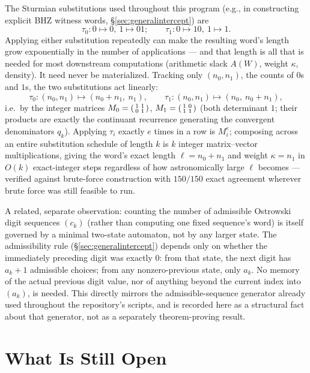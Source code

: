 \documentclass[11pt]{article}
\begin{document}
The Sturmian substitutions used throughout this program (e.g., in constructing explicit BHZ witness words, \S\ref{sec:generalintercept}) are
\[
\tau_0: 0\mapsto 0,\ 1\mapsto 01; \qquad \tau_1: 0\mapsto 10,\ 1\mapsto 1.
\]
Applying either substitution repeatedly can make the resulting word's length grow exponentially in the number of applications --- and that length is all that is needed for most downstream computations (arithmetic slack $A(W)$, weight $\kappa$, density). It need never be materialized. Tracking only $(n_0,n_1)$, the counts of $0$s and $1$s, the two substitutions act linearly:
\[
\tau_0: (n_0,n_1)\mapsto(n_0+n_1,\ n_1), \qquad
\tau_1: (n_0,n_1)\mapsto(n_0,\ n_0+n_1),
\]
i.e.\ by the integer matrices $M_0=\begin{psmallmatrix}1&1\\0&1\end{psmallmatrix}$, $M_1=\begin{psmallmatrix}1&0\\1&1\end{psmallmatrix}$ (both determinant $1$; their products are exactly the continuant recurrence generating the convergent denominators $q_k$). Applying $\tau_i$ exactly $e$ times in a row is $M_i^e$; composing across an entire substitution schedule of length $k$ is $k$ integer matrix--vector multiplications, giving the word's exact length $\ell=n_0+n_1$ and weight $\kappa=n_1$ in $O(k)$ exact-integer steps regardless of how astronomically large $\ell$ becomes --- verified against brute-force construction with $150/150$ exact agreement wherever brute force was still feasible to run.

A related, separate observation: counting the number of admissible Ostrowski digit sequences $(c_k)$ (rather than computing one fixed sequence's word) is itself governed by a minimal two-state automaton, not by any larger state. The admissibility rule (\S\ref{sec:generalintercept}) depends only on whether the immediately preceding digit was exactly $0$: from that state, the next digit has $a_k+1$ admissible choices; from any nonzero-previous state, only $a_k$. No memory of the actual previous digit value, nor of anything beyond the current index into $(a_k)$, is needed. This directly mirrors the admissible-sequence generator already used throughout the repository's scripts, and is recorded here as a structural fact about that generator, not as a separately theorem-proving result.

\section{What Is Still Open}
\label{sec:open}
\end{document}
